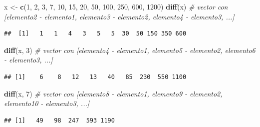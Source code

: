 \documentclass[11pt,]{book}
\newenvironment{Shaded}{\begin{snugshade}}{\end{snugshade}}
\newcommand{\CommentTok}[1]{\textcolor[rgb]{0.37,0.37,0.37}{\textit{#1}}}
\newcommand{\DecValTok}[1]{\textcolor[rgb]{0.06,0.06,0.06}{#1}}
\newcommand{\KeywordTok}[1]{\textcolor[rgb]{0.27,0.27,0.27}{\textbf{#1}}}
\newcommand{\NormalTok}[1]{#1}
\newcommand{\StringTok}[1]{\textcolor[rgb]{0.5,0.5,0.5}{#1}}
\begin{document}
\begin{Shaded}
\begin{Highlighting}[]
\NormalTok{x <-}\StringTok{ }\KeywordTok{c}\NormalTok{(}\DecValTok{1}\NormalTok{, }\DecValTok{2}\NormalTok{, }\DecValTok{3}\NormalTok{, }\DecValTok{7}\NormalTok{, }\DecValTok{10}\NormalTok{, }\DecValTok{15}\NormalTok{, }\DecValTok{20}\NormalTok{, }\DecValTok{50}\NormalTok{, }\DecValTok{100}\NormalTok{, }\DecValTok{250}\NormalTok{, }\DecValTok{600}\NormalTok{, }\DecValTok{1200}\NormalTok{)}
\KeywordTok{diff}\NormalTok{(x) }\CommentTok{# vector con [elemento2 - elemento1, elemento3 - elemento2, elemento4 - elemento3, ...]}
\end{Highlighting}
\end{Shaded}

\begin{verbatim}
##  [1]   1   1   4   3   5   5  30  50 150 350 600
\end{verbatim}

\begin{Shaded}
\begin{Highlighting}[]
\KeywordTok{diff}\NormalTok{(x, }\DecValTok{3}\NormalTok{) }\CommentTok{# vector con [elemento4 - elemento1, elemento5 - elemento2, elemento6 - elemento3, ...]}
\end{Highlighting}
\end{Shaded}

\begin{verbatim}
## [1]    6    8   12   13   40   85  230  550 1100
\end{verbatim}

\begin{Shaded}
\begin{Highlighting}[]
\KeywordTok{diff}\NormalTok{(x, }\DecValTok{7}\NormalTok{) }\CommentTok{# vector con [elemento8 - elemento1, elemento9 - elemento2, elemento10 - elemento3, ...]}
\end{Highlighting}
\end{Shaded}

\begin{verbatim}
## [1]   49   98  247  593 1190
\end{verbatim}
\end{document}
